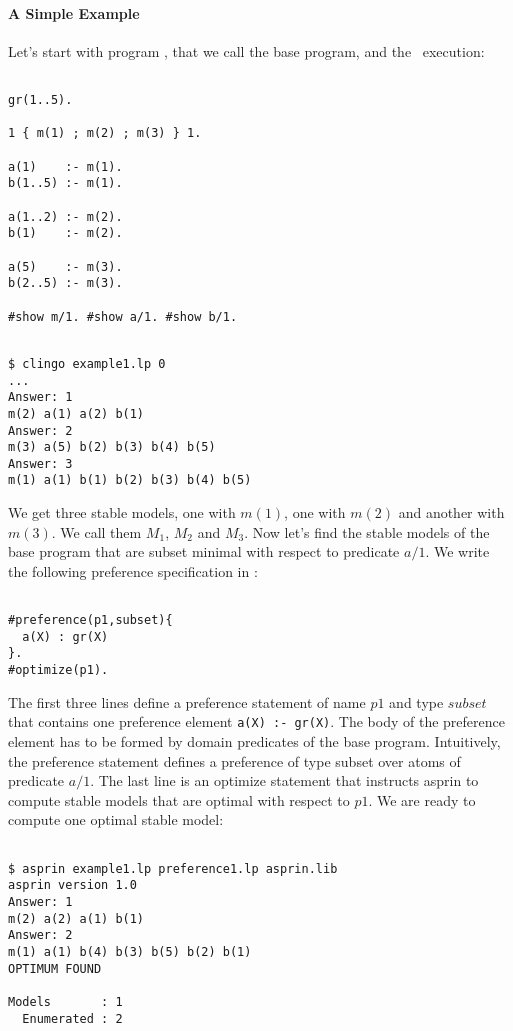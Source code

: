 

\paragraph{A Simple Example}

Let's start with program  , that we call the base program,  and the  \clingo\  execution: 
\begin{verbatim}

gr(1..5).

1 { m(1) ; m(2) ; m(3) } 1.   

a(1)    :- m(1).
b(1..5) :- m(1).

a(1..2) :- m(2).
b(1)    :- m(2).

a(5)    :- m(3).
b(2..5) :- m(3). 

#show m/1. #show a/1. #show b/1.
\end{verbatim}
\begin{verbatim}

$ clingo example1.lp 0
...
Answer: 1
m(2) a(1) a(2) b(1) 
Answer: 2
m(3) a(5) b(2) b(3) b(4) b(5) 
Answer: 3
m(1) a(1) b(1) b(2) b(3) b(4) b(5)

\end{verbatim}
We get three stable models, one with $m(1)$, one with $m(2)$ and another with $m(3)$. We call them $M_1$, $M_2$ and $M_3$. 
Now let's find the stable models of the base program that are subset minimal with respect to predicate $a/1$. 
We write the following preference specification in : 
\begin{verbatim}

#preference(p1,subset){                                                                                             
  a(X) : gr(X)                                                                                                    
}.
#optimize(p1).
\end{verbatim}
The first three lines define a preference statement of name $p1$ and type $subset$ that contains one preference element 
\lstinline{a(X) :- gr(X)}. The body of the preference element has to be formed by domain predicates of the base program.
Intuitively, the preference statement defines a preference of type subset over atoms of predicate $a/1$. 
The last line is an optimize statement that instructs asprin to compute stable models that are optimal with respect to $p1$. 
We are ready to compute one optimal stable model: 
\begin{verbatim}

$ asprin example1.lp preference1.lp asprin.lib
asprin version 1.0
Answer: 1
m(2) a(2) a(1) b(1)
Answer: 2
m(1) a(1) b(4) b(3) b(5) b(2) b(1)
OPTIMUM FOUND

Models       : 1
  Enumerated : 2

\end{verbatim}
